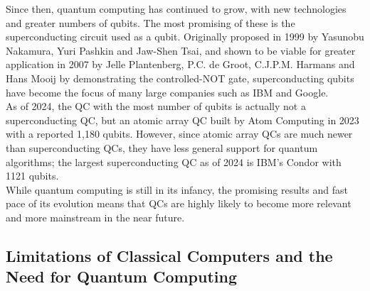 \documentclass[reqno]{amsart}
\numberwithin{equation}{section}
\numberwithin{figure}{section}
\begin{document}
\begin{justify}
Since then, quantum computing has continued to grow, with new technologies and greater numbers of qubits. The most promising of these is the superconducting circuit used as a qubit. Originally proposed in 1999 by Yasunobu Nakamura, Yuri Pashkin and Jaw-Shen Tsai, \cite{NakamuraPashkinTsai1999} and shown to be viable for greater application in 2007 by Jelle Plantenberg, P.C. de Groot, C.J.P.M. Harmans and Hans Mooij by demonstrating the controlled-NOT gate, \cite{PlantenbergGrootHarmansMooij2007} superconducting qubits have become the focus of many large companies such as IBM and Google. \\

As of 2024, the QC with the most number of qubits is actually not a superconducting QC, but an atomic array QC built by Atom Computing in 2023 \cite{Atom2023, Atom2024} with a reported 1,180 qubits. However, since atomic array QCs are much newer than superconducting QCs, they have less general support for quantum algorithms; the largest superconducting QC as of 2024 is IBM's Condor with 1121 qubits. \cite{IBM2023, AbuGhanem2024} \\

While quantum computing is still in its infancy, the promising results and fast pace of its evolution means that QCs are highly likely to become more relevant and more mainstream in the near future.
\end{justify}

\subsection{Limitations of Classical Computers and the Need for Quantum Computing}
\end{document}
